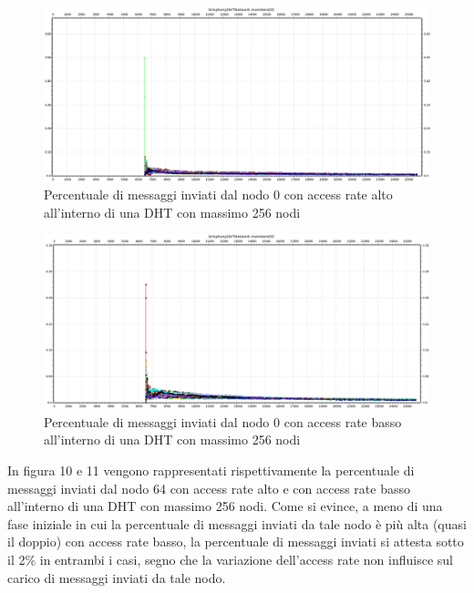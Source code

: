 \documentclass[	
	DIV=calc,
	paper=a4,
	fontsize=11pt,
	onecolumn
]{scrartcl} %
\begin{document}
	\begin{figure}[H]
		\centering
		\includegraphics[scale=0.35]	{SymphonyDHT/plots/PercentageOfMessagesSent/256_Nodes_FastAccess/SymphonyDHT_256Nodes_FastAccess_Node0.png}
		\caption{Percentuale di messaggi inviati dal nodo 0 con access rate alto all'interno di una DHT con massimo 256 nodi}
		\label{Figura 8}
	\end{figure}
	\begin{figure}[H]
		\centering
		\includegraphics[scale=0.35]	{SymphonyDHT/plots/PercentageOfMessagesSent/256_Nodes_SlowAccess/SymphonyDHT_256Nodes_SlowAccess_Node0.png}
		\caption{Percentuale di messaggi inviati dal nodo 0 con access rate basso all'interno di una DHT con massimo 256 nodi}
		\label{Figura 9}
	\end{figure}	
	
	In figura 10 e 11 vengono rappresentati rispettivamente la percentuale di messaggi inviati dal nodo 64 con access rate alto e con access rate basso all'interno di una DHT con massimo 256 nodi. Come si evince, a meno di una fase iniziale in cui la percentuale di messaggi inviati da tale nodo è più alta (quasi il doppio) con access rate basso, la percentuale di messaggi inviati si attesta sotto il 2\% in entrambi i casi, segno che la variazione dell'access rate non influisce sul carico di messaggi inviati da tale nodo.
	
\end{document}
